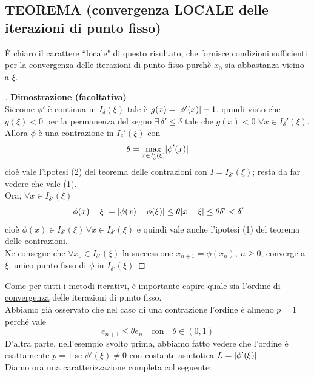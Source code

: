 \subsection{TEOREMA (convergenza LOCALE delle iterazioni di punto fisso)}
\begin{center}
\end{center}
È chiaro il carattere ``locale" di questo risultato, che fornisce
condizioni sufficienti per la convergenza delle iterazioni di punto fisso purchè $x_0$ \uline{sia abbastanza vicino a $\xi$}.
\newline 
\begin{proof}[\unskip\nopunct]
\textbf{Dimostrazione (facoltativa)}\\
Siccome $\phi'$ è continua in $I_{\delta}(\xi)$ tale è $g(x)=\lvert\phi'(x)\rvert-1$, quindi visto che $g(\xi)<0$ per la permanenza del segno $\exists \, \delta'\le \delta$ tale che $g(x)<0$ $\forall x\in I_{\delta}'(\xi)$. Allora $\phi$ è una contrazione in $I_{\delta}'(\xi)$ con 
\[\theta=\max_{x \in I_{\delta}'(\xi)} \lvert\phi'(x)\rvert\]
cioè vale l'ipotesi (2) del teorema delle contrazioni con $I=I_{\delta'}(\xi)$; resta da far vedere che vale (1).\\
Ora, $\forall x \in I_{\delta'}(\xi)$
\[ \lvert\phi(x) - \xi\rvert = \lvert\phi(x) - \phi(\xi)\rvert \leq \theta \lvert x-\xi\rvert \leq \theta \delta' < \delta' \]
cioè $\phi(x) \in I_{\delta'}(\xi)\, \forall x \in I_{\delta'}(\xi)$ e quindi vale anche l'ipotesi (1) del teorema delle contrazioni. \\
Ne consegue che $\forall x_0 \in I_{\delta'}(\xi)$ la successione $x_{n+1} = \phi(x_n), \, n \ge 0$, converge a $\xi$, unico punto fisso di $\phi$ in $I_{\delta'}(\xi)$
\end{proof}

\bigskip
Come per tutti i metodi iterativi, è importante capire quale sia l'\uline{ordine di convergenza} delle iterazioni di punto fisso.\\
Abbiamo già osservato che nel caso di una contrazione l'ordine è almeno $p=1$ perché vale \[e_{n+1}\leq\theta e_n \quad \text{con} \quad \theta \in (0,1)\]
D'altra parte, nell'esempio svolto prima, abbiamo fatto vedere che l'ordine è esattamente $p=1$ se $\phi'(\xi)\neq 0$ con costante asintotica $L=\lvert\phi'(\xi)\rvert$\\
Diamo ora una caratterizzazione completa col seguente:

